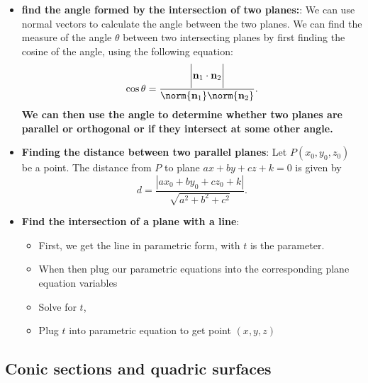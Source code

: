 \documentclass{report}
\begin{document}
\begin{itemize}
\begin{itemize}
        \end{itemize}
    \item \textbf{find the angle formed by the intersection of two planes:}: We can use normal vectors to calculate the angle between the two planes.
        \bigbreak \noindent 
        We can find the measure of the angle $\theta$ between two intersecting planes by first finding the cosine of the angle, using the following equation:
        \begin{align*}
            \cos{\theta }= \frac{\bigg\lvert \mathbf{n}_{1} \cdot \mathbf{n}_{2} \bigg\rvert}{\norm{\mathbf{n}_{1}}\norm{\mathbf{n}_{2}}}
        .\end{align*}
        \textbf{We can then use the angle to determine whether two planes are parallel or orthogonal or if they intersect at some other angle.}
        \pagebreak 
    \item \textbf{Finding the distance between two parallel planes}: 
        Let $P(x_0, y_0, z_0)$ be a point. The distance from $P$ to plane $ax + by + cz + k = 0$ is given by
        \[
            d = \frac{\left| ax_0 + by_0 + cz_0 + k \right|}{\sqrt{a^2 + b^2 + c^2}}.
        \]
    \item \textbf{Find the intersection of a plane with a line}:
        \begin{itemize}
            \item First, we get the line in parametric form, with $t$ is the parameter.
            \item When then plug our parametric equations into the corresponding plane equation variables
            \item Solve for $t$,
            \item Plug $t$ into parametric equation to get point $(x,y,z)$
        \end{itemize}

    \end{itemize}
    \pagebreak 
    \subsection{Conic sections and quadric surfaces}
    \bigbreak \noindent 
\end{document}
